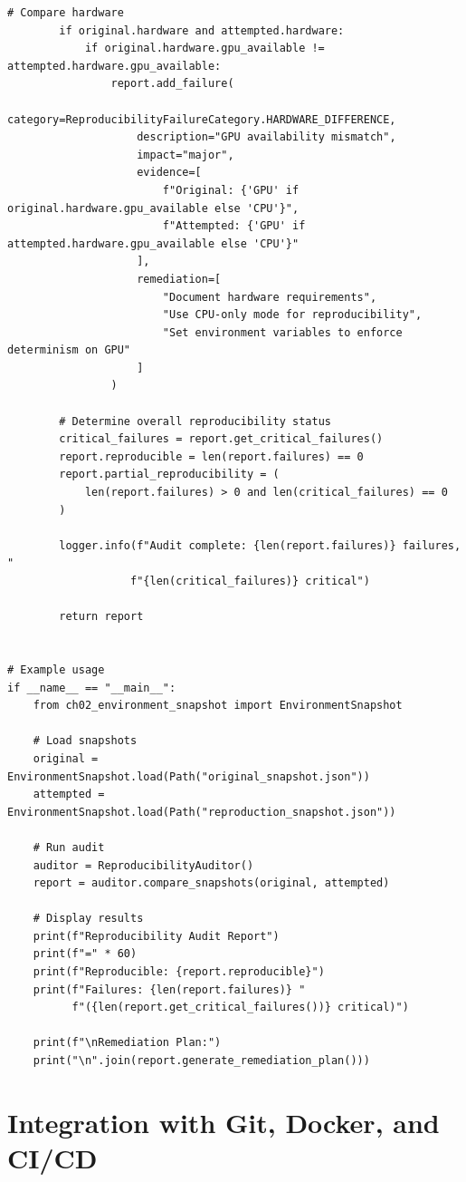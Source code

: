 \begin{lstlisting}[style=python, caption={Post-incident reproducibility audit framework}]
        # Compare hardware
        if original.hardware and attempted.hardware:
            if original.hardware.gpu_available != attempted.hardware.gpu_available:
                report.add_failure(
                    category=ReproducibilityFailureCategory.HARDWARE_DIFFERENCE,
                    description="GPU availability mismatch",
                    impact="major",
                    evidence=[
                        f"Original: {'GPU' if original.hardware.gpu_available else 'CPU'}",
                        f"Attempted: {'GPU' if attempted.hardware.gpu_available else 'CPU'}"
                    ],
                    remediation=[
                        "Document hardware requirements",
                        "Use CPU-only mode for reproducibility",
                        "Set environment variables to enforce determinism on GPU"
                    ]
                )

        # Determine overall reproducibility status
        critical_failures = report.get_critical_failures()
        report.reproducible = len(report.failures) == 0
        report.partial_reproducibility = (
            len(report.failures) > 0 and len(critical_failures) == 0
        )

        logger.info(f"Audit complete: {len(report.failures)} failures, "
                   f"{len(critical_failures)} critical")

        return report


# Example usage
if __name__ == "__main__":
    from ch02_environment_snapshot import EnvironmentSnapshot

    # Load snapshots
    original = EnvironmentSnapshot.load(Path("original_snapshot.json"))
    attempted = EnvironmentSnapshot.load(Path("reproduction_snapshot.json"))

    # Run audit
    auditor = ReproducibilityAuditor()
    report = auditor.compare_snapshots(original, attempted)

    # Display results
    print(f"Reproducibility Audit Report")
    print(f"=" * 60)
    print(f"Reproducible: {report.reproducible}")
    print(f"Failures: {len(report.failures)} "
          f"({len(report.get_critical_failures())} critical)")

    print(f"\nRemediation Plan:")
    print("\n".join(report.generate_remediation_plan()))
\end{lstlisting}

\section{Integration with Git, Docker, and CI/CD}

